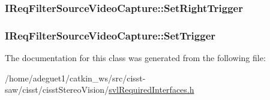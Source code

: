 \hypertarget{class_i_req_filter_source_video_capture_a2e4c7dd3ff46016da70c23ffe9730552}{
\subsubsection[{Set\-Right\-Trigger}]{ I\-Req\-Filter\-Source\-Video\-Capture\-::\-Set\-Right\-Trigger}}\label{class_i_req_filter_source_video_capture_a2e4c7dd3ff46016da70c23ffe9730552}
\hypertarget{class_i_req_filter_source_video_capture_a98af73f8fa32e3104594021816f91175}{
\subsubsection[{Set\-Trigger}]{ I\-Req\-Filter\-Source\-Video\-Capture\-::\-Set\-Trigger}}\label{class_i_req_filter_source_video_capture_a98af73f8fa32e3104594021816f91175}


The documentation for this class was generated from the following file\-:\begin{DoxyCompactItemize}
\item 
/home/adeguet1/catkin\-\_\-ws/src/cisst-\/saw/cisst/cisst\-Stereo\-Vision/\hyperlink{svl_required_interfaces_8h}{svl\-Required\-Interfaces.\-h}\end{DoxyCompactItemize}
